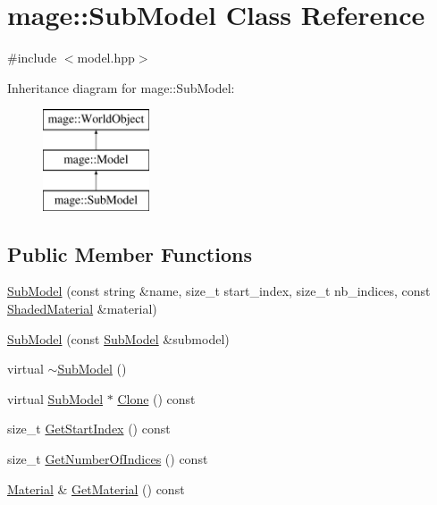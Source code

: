 \hypertarget{classmage_1_1_sub_model}{}\section{mage\+:\+:Sub\+Model Class Reference}
\label{classmage_1_1_sub_model}


{\ttfamily \#include $<$model.\+hpp$>$}

Inheritance diagram for mage\+:\+:Sub\+Model\+:\begin{figure}[H]
\begin{center}
\leavevmode
\includegraphics[height=3.000000cm]{classmage_1_1_sub_model}
\end{center}
\end{figure}
\subsection*{Public Member Functions}
\begin{DoxyCompactItemize}
\item 
\hyperlink{classmage_1_1_sub_model_a26dce7b076af1edb4209d0a236a250ef}{Sub\+Model} (const string \&name, size\+\_\+t start\+\_\+index, size\+\_\+t nb\+\_\+indices, const \hyperlink{structmage_1_1_shaded_material}{Shaded\+Material} \&material)
\item 
\hyperlink{classmage_1_1_sub_model_ae71dcb72fc1b06710b390c97a2db1d68}{Sub\+Model} (const \hyperlink{classmage_1_1_sub_model}{Sub\+Model} \&submodel)
\item 
virtual \hyperlink{classmage_1_1_sub_model_a0e92faaeeeec8d4c55c67adf4a501d0d}{$\sim$\+Sub\+Model} ()
\item 
virtual \hyperlink{classmage_1_1_sub_model}{Sub\+Model} $\ast$ \hyperlink{classmage_1_1_sub_model_a368bcc2ee819cc29ec0203e314ae91d3}{Clone} () const
\item 
size\+\_\+t \hyperlink{classmage_1_1_sub_model_a2b901cb62dca26a7ff399719e0a4ba66}{Get\+Start\+Index} () const
\item 
size\+\_\+t \hyperlink{classmage_1_1_sub_model_a18736678fc1a5d882776298053e037b3}{Get\+Number\+Of\+Indices} () const
\item 
\hyperlink{structmage_1_1_material}{Material} \& \hyperlink{classmage_1_1_sub_model_af993f41f73a72df9fca154083c5f7410}{Get\+Material} () const
\end{DoxyCompactItemize}
